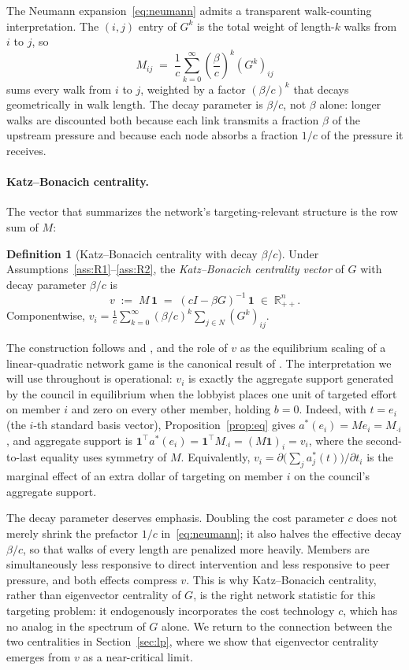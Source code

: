 \documentclass[11pt,letterpaper]{article}
\theoremstyle{plain}
\theoremstyle{definition}
\newtheorem{definition}{Definition}
\theoremstyle{remark}
\begin{document}
The Neumann expansion~\eqref{eq:neumann} admits a transparent walk-counting interpretation. The $(i,j)$ entry of $G^k$ is the total weight of length-$k$ walks from $i$ to $j$, so
\[
M_{ij} \;=\; \frac{1}{c}\sum_{k=0}^\infty \left(\frac{\beta}{c}\right)^{\!k} (G^k)_{ij}
\]
sums every walk from $i$ to $j$, weighted by a factor $(\beta/c)^k$ that decays geometrically in walk length. The decay parameter is $\beta/c$, not $\beta$ alone: longer walks are discounted both because each link transmits a fraction $\beta$ of the upstream pressure and because each node absorbs a fraction $1/c$ of the pressure it receives.

\paragraph{Katz--Bonacich centrality.} The vector that summarizes the network's targeting-relevant structure is the row sum of $M$:
\begin{definition}[Katz--Bonacich centrality with decay $\beta/c$]\label{def:katz}
Under Assumptions~\ref{ass:R1}--\ref{ass:R2}, the \emph{Katz--Bonacich centrality vector} of $G$ with decay parameter $\beta/c$ is
\begin{equation}
v \;:=\; M\,\mathbf{1} \;=\; (cI - \beta G)^{-1}\,\mathbf{1} \;\in\; \mathbb{R}^n_{++}.
\label{eq:bonacich}
\end{equation}
Componentwise, $v_i = \tfrac{1}{c}\sum_{k=0}^\infty (\beta/c)^k \sum_{j \in N} (G^k)_{ij}$.
\end{definition}

The construction follows \citet{katz1953} and \citet{bonacich1987}, and the role of $v$ as the equilibrium scaling of a linear-quadratic network game is the canonical result of \citet{bcz2006}. The interpretation we will use throughout is operational: $v_i$ is exactly the aggregate support generated by the council in equilibrium when the lobbyist places one unit of targeted effort on member $i$ and zero on every other member, holding $b = 0$. Indeed, with $t = e_i$ (the $i$-th standard basis vector), Proposition~\ref{prop:eq} gives $a^*(e_i) = M e_i = M_{\cdot i}$, and aggregate support is $\mathbf{1}^\top a^*(e_i) = \mathbf{1}^\top M_{\cdot i} = (M\mathbf{1})_i = v_i$, where the second-to-last equality uses symmetry of $M$. Equivalently, $v_i = \partial \big( \sum_j a_j^*(t) \big) / \partial t_i$ is the marginal effect of an extra dollar of targeting on member $i$ on the council's aggregate support.

The decay parameter deserves emphasis. Doubling the cost parameter $c$ does not merely shrink the prefactor $1/c$ in~\eqref{eq:neumann}; it also halves the effective decay $\beta/c$, so that walks of every length are penalized more heavily. Members are simultaneously less responsive to direct intervention and less responsive to peer pressure, and both effects compress $v$. This is why Katz--Bonacich centrality, rather than eigenvector centrality of $G$, is the right network statistic for this targeting problem: it endogenously incorporates the cost technology $c$, which has no analog in the spectrum of $G$ alone. We return to the connection between the two centralities in Section~\ref{sec:lp}, where we show that eigenvector centrality emerges from $v$ as a near-critical limit.
\end{document}
